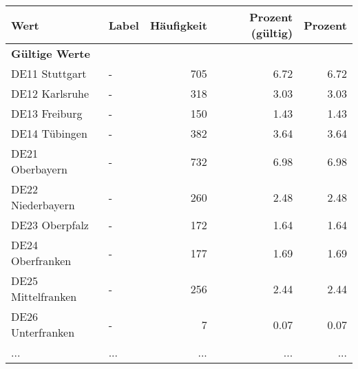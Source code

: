      \begin{longtable}{Xlrrr}
     \toprule
     \textbf{Wert} & \textbf{Label} & \textbf{Häufigkeit} & \textbf{Prozent (gültig)} & \textbf{Prozent} \\
     \endhead
     \midrule
     \multicolumn{5}{l}{\textbf{Gültige Werte}}\\
        \multicolumn{1}{X}{DE11 Stuttgart} & - & \num{705} & \num[round-mode=places,round-precision=2]{6.72} & \num[round-mode=places,round-precision=2]{6.72} \\
        \multicolumn{1}{X}{DE12 Karlsruhe} & - & \num{318} & \num[round-mode=places,round-precision=2]{3.03} & \num[round-mode=places,round-precision=2]{3.03} \\
        \multicolumn{1}{X}{DE13 Freiburg} & - & \num{150} & \num[round-mode=places,round-precision=2]{1.43} & \num[round-mode=places,round-precision=2]{1.43} \\
        \multicolumn{1}{X}{DE14 Tübingen} & - & \num{382} & \num[round-mode=places,round-precision=2]{3.64} & \num[round-mode=places,round-precision=2]{3.64} \\
        \multicolumn{1}{X}{DE21 Oberbayern} & - & \num{732} & \num[round-mode=places,round-precision=2]{6.98} & \num[round-mode=places,round-precision=2]{6.98} \\
        \multicolumn{1}{X}{DE22 Niederbayern} & - & \num{260} & \num[round-mode=places,round-precision=2]{2.48} & \num[round-mode=places,round-precision=2]{2.48} \\
        \multicolumn{1}{X}{DE23 Oberpfalz} & - & \num{172} & \num[round-mode=places,round-precision=2]{1.64} & \num[round-mode=places,round-precision=2]{1.64} \\
        \multicolumn{1}{X}{DE24 Oberfranken} & - & \num{177} & \num[round-mode=places,round-precision=2]{1.69} & \num[round-mode=places,round-precision=2]{1.69} \\
        \multicolumn{1}{X}{DE25 Mittelfranken} & - & \num{256} & \num[round-mode=places,round-precision=2]{2.44} & \num[round-mode=places,round-precision=2]{2.44} \\
        \multicolumn{1}{X}{DE26 Unterfranken} & - & \num{7} & \num[round-mode=places,round-precision=2]{0.07} & \num[round-mode=places,round-precision=2]{0.07} \\
       ... & ... & ... & ... & ... \\

\end{longtable}
